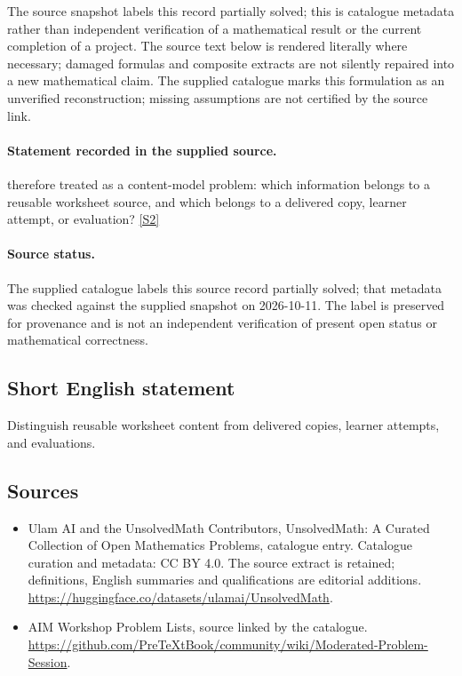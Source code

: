 \documentclass[11pt]{article}
\begin{document}
The source snapshot labels this record partially solved; this is catalogue metadata rather than independent verification of a mathematical result or the current completion of a project.
The source text below is rendered literally where necessary; damaged formulas and composite extracts are not silently repaired into a new mathematical claim.
The supplied catalogue marks this formulation as an unverified reconstruction; missing assumptions are not certified by the source link.
\paragraph{Statement recorded in the supplied source.}
therefore treated as a content-model problem: which information belongs to a
reusable worksheet source, and which belongs to a delivered copy, learner
attempt, or evaluation? \href{https://github.com/PreTeXtBook/community/wiki/Moderated-Problem-Session}{[S2]}
\paragraph{Source status.}
The supplied catalogue labels this source record partially solved; that metadata was checked against the supplied snapshot on 2026-10-11. The label is preserved for provenance and is not an independent verification of present open status or mathematical correctness.
\subsection{Short English statement}
Distinguish reusable worksheet content from delivered copies, learner attempts, and evaluations.
\subsection{Sources}
\begin{itemize}
\item[S1] Ulam AI and the UnsolvedMath Contributors, UnsolvedMath: A Curated Collection of Open Mathematics Problems, catalogue entry. Catalogue curation and metadata: CC BY 4.0. The source extract is retained; definitions, English summaries and qualifications are editorial additions.
\url{https://huggingface.co/datasets/ulamai/UnsolvedMath}.
\item[S2] AIM Workshop Problem Lists, source linked by the catalogue.
\url{https://github.com/PreTeXtBook/community/wiki/Moderated-Problem-Session}.
\end{itemize}
\end{document}
